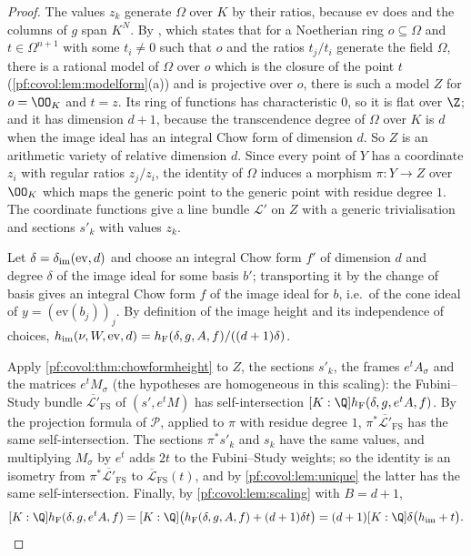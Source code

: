 \begin{proof}
The values $z_k$ generate $\Omega$ over $K$ by their ratios, because $\mathrm{ev}$ does and the columns of
$g$ span $K^N$. By , which states that for a
Noetherian ring $o\subseteq\Omega$ and $t\in\Omega^{n+1}$ with some $t_i\ne0$ such that $o$ and the ratios
$t_j/t_i$ generate the field $\Omega$, there is a rational model of $\Omega$ over $o$ which is the closure
of the point $t$ (\cref{pf:covol:lem:modelform}(a)) and is projective over $o$, there is such a model $Z$
for $o=\OO_K$ and $t=z$. Its ring of functions has characteristic $0$, so it is flat over $\Z$; and it has
dimension $d+1$, because the transcendence degree of $\Omega$ over $K$ is $d$ when the image ideal has an
integral Chow form of dimension $d$. So $Z$ is an arithmetic variety of relative dimension $d$. Since
every point of $Y$ has a coordinate $z_i$ with regular ratios $z_j/z_i$, the identity of $\Omega$ induces
a morphism $\pi\colon Y\to Z$ over $\OO_K$ which maps the generic point to the generic point with residue
degree $1$. The coordinate functions give a line bundle $\mathcal L'$ on $Z$ with a generic trivialisation
and sections $s'_k$ with values $z_k$.

Let $\delta=\delta_{\mathrm{im}}(\mathrm{ev},d)$ and choose an integral Chow form $f'$ of dimension $d$ and degree
$\delta$ of the image ideal for some basis $b'$; transporting it by the change of basis gives an integral
Chow form $f$ of the image ideal for $b$, i.e.\ of the cone ideal of $y=(\mathrm{ev}(b_j))_j$. By
definition of the image height and its independence of choices,
$h_{\mathrm{im}}(\nu,W,\mathrm{ev},d)=h_{\mathrm{F}}(\delta,g,A,f)/((d+1)\delta)$.

Apply \cref{pf:covol:thm:chowformheight} to $Z$, the sections $s'_k$, the frames $e^tA_\sigma$ and the
matrices $e^tM_\sigma$ (the hypotheses are homogeneous in this scaling): the Fubini--Study bundle
$\overline{\mathcal L'}_{\mathrm{FS}}$ of $(s',e^tM)$ has self-intersection
$[K:\Q]\covolHform(\delta,g,e^tA,f)$. By the projection formula of $\mathcal P$, applied to $\pi$ with
residue degree $1$, $\pi^*\overline{\mathcal L'}_{\mathrm{FS}}$ has the same self-intersection. The
sections $\pi^*s'_k$ and $s_k$ have the same values, and multiplying $M_\sigma$ by $e^t$ adds $2t$ to the
Fubini--Study weights; so the identity is an isometry from $\pi^*\overline{\mathcal L'}_{\mathrm{FS}}$ to
$\overline{\mathcal L}_{\mathrm{FS}}(t)$, and by \cref{pf:covol:lem:unique} the latter has the same
self-intersection. Finally, by \cref{pf:covol:lem:scaling} with $B=d+1$,
\[
[K:\Q]\covolHform(\delta,g,e^tA,f)=[K:\Q]\bigl(\covolHform(\delta,g,A,f)+(d+1)\delta t\bigr)=
(d+1)[K:\Q]\delta\bigl(\covolImHt+t\bigr).\qedhere
\]
\end{proof}

